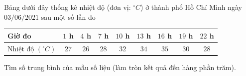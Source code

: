 \begin{ex}%
Bảng dưới đây thống kê nhiệt độ (đơn vị: ${}^{\circ}{C}$) ở thành phố Hồ Chí Minh ngày $03 / 06 / 2021$ sau một số lần đo
\begin{center}
\begin{tabular}{|l|c|c|c|c|c|c|c|c|}
\hline Giờ đo & $1 $ h
& $4 $ h & $7 $ h & $10 $ h & $13 $ h & $16 $ h & $19 $ h & $22 $ h \\
\hline Nhiệt độ $\left({}^{\circ}{C}\right)$ & $27$ & $26$ & $28$ & $32$ & $34$ & $35$ & $30$ & $28$ \\
\hline
\end{tabular}
\end{center}
Tìm số trung bình của mẫu số liệu (làm tròn kết quả đến hàng phần trăm).
\end{ex}

